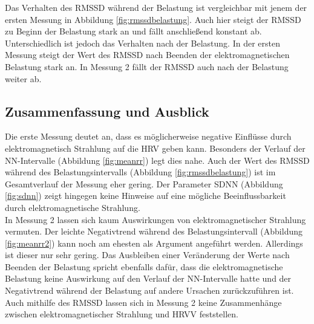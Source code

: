 Das Verhalten des \acs{RMSSD} während der Belastung ist vergleichbar mit jenem der ersten Messung in Abbildung \ref{fig:rmssdbelastung}. Auch hier steigt der \acs{RMSSD} zu Beginn der Belastung stark an und fällt anschließend konstant ab. Unterschiedlich ist jedoch das Verhalten nach der Belastung. In der ersten Messung steigt der Wert des \acs{RMSSD} nach Beenden der elektromagnetischen Belastung stark an. In Messung 2 fällt der RMSSD auch nach der Belastung weiter ab.

\subsection{Zusammenfassung und Ausblick}
Die erste Messung deutet an, dass es möglicherweise negative Einflüsse durch elektromagnetisch Strahlung auf die \acs{HRV} geben kann. Besonders der Verlauf der NN-Intervalle (Abbildung \ref{fig:meanrr}) legt dies nahe. Auch der Wert des \acs{RMSSD} während des Belastungsintervalls (Abbildung \ref{fig:rmssdbelastung})  ist im Gesamtverlauf der Messung eher gering. Der Parameter \acs{SDNN} (Abbildung \ref{fig:sdnn}) zeigt hingegen keine Hinweise auf eine mögliche Beeinflussbarkeit durch elektromagnetische Strahlung. \\
In Messung 2 lassen sich kaum Auswirkungen von elektromagnetischer Strahlung vermuten. Der leichte Negativtrend während des Belastungsintervall (Abbildung \ref{fig:meanrr2}) kann noch am ehesten als Argument angeführt werden. Allerdings ist dieser nur sehr gering. Das Ausbleiben einer Veränderung der Werte nach Beenden der Belastung spricht ebenfalls dafür, dass die elektromagnetische Belastung keine Auswirkung auf den Verlauf der NN-Intervalle hatte und der Negativtrend während der Belastung auf andere Ursachen zurückzuführen ist. Auch mithilfe des \acs{RMSSD} lassen sich in Messung 2 keine Zusammenhänge zwischen elektromagnetischer Strahlung und \acs{HRV}V feststellen.\\

